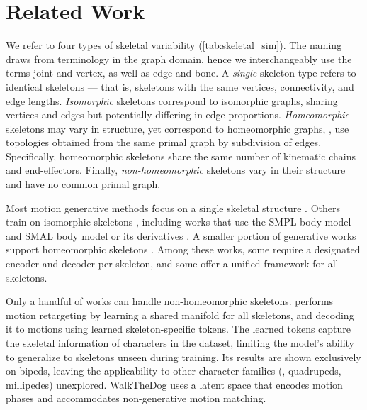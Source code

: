 \section{Related Work}\label{sec:related_work}




We refer to four types of skeletal variability (\cref{tab:skeletal_sim}). The naming draws from terminology in the graph domain, hence we interchangeably use the terms joint and vertex, as well as edge and bone. 
A \emph{single} skeleton type refers to identical skeletons — that is, skeletons with the same vertices, connectivity, and edge lengths.
\emph{Isomorphic} skeletons correspond to isomorphic graphs, sharing vertices and edges but potentially differing in edge proportions.
\emph{Homeomorphic} skeletons may vary in structure, yet correspond to homeomorphic graphs, \ie,
use topologies obtained from the same primal graph by subdivision of edges. Specifically, homeomorphic skeletons share the same number of kinematic chains and end-effectors.
Finally, \emph{non-homeomorphic} skeletons vary in their structure and have no common primal graph. 

Most motion generative methods focus on a single skeletal structure \cite{raab2023modi, petrovich2021actor, karunratanakul2023gmd}. Others train on isomorphic skeletons \cite{zhang2023skinned,Villegas2021ContactAwareRO}, including works that use the SMPL \cite{loper2015smpl} 
body model
\cite{tripathi2024humos,jang2024geometry,petrovich2022temos} and SMAL \cite{zuffi20173d} 
body model
or its derivatives \cite{yang2023omnimotiongpt,rueegg2023barc}. A smaller portion of generative works support homeomorphic skeletons \cite{lee2023same,zhang2024skinned,cao2024car,studer2024factorized, ponton2024dragposer}. Among these works, some \cite{aberman2020skeleton} require a designated encoder and decoder per skeleton, and some \cite{zhang2024unified} 
offer a unified framework for all skeletons.

Only a handful of works can handle non-homeomorphic skeletons. \citet{martinelli2024moma} performs motion retargeting by learning a shared manifold for all skeletons, and decoding it to motions using learned skeleton-specific tokens.
The learned tokens capture the skeletal information of characters in the dataset, 
limiting the model's ability to generalize to skeletons unseen during training. Its results are shown exclusively on bipeds, leaving the applicability to other character families (\eg, quadrupeds, millipedes) unexplored.
WalkTheDog \cite{Li2024walkthedog} uses a latent space that encodes motion phases and accommodates non-generative motion matching. 


